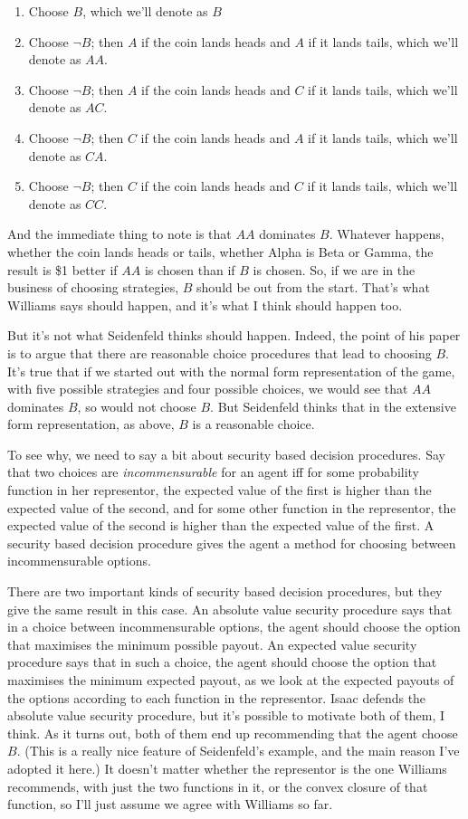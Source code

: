 \begin{enumerate}
\item Choose $B$, which we'll denote as $B$
\item Choose $\neg B$; then $A$ if the coin lands heads and $A$ if it lands tails, which we'll denote as $AA$.
\item Choose $\neg B$; then $A$ if the coin lands heads and $C$ if it lands tails, which we'll denote as $AC$.
\item Choose $\neg B$; then $C$ if the coin lands heads and $A$ if it lands tails, which we'll denote as $CA$.
\item Choose $\neg B$; then $C$ if the coin lands heads and $C$ if it lands tails, which we'll denote as $CC$.
\end{enumerate}
And the immediate thing to note is that $AA$ dominates $B$. Whatever happens, whether the coin lands heads or tails, whether Alpha is Beta or Gamma, the result is \$1 better if $AA$ is chosen than if $B$ is chosen. So, if we are in the business of choosing strategies, $B$ should be out from the start. That's what Williams says should happen, and it's what I think should happen too.

But it's not what Seidenfeld thinks should happen. Indeed, the point of his paper is to argue that there are reasonable choice procedures that lead to choosing $B$. It's true that if we started out with the normal form representation of the game, with five possible strategies and four possible choices, we would see that $AA$ dominates $B$, so would not choose $B$. But Seidenfeld thinks that in the extensive form representation, as above, $B$ is a reasonable choice.

To see why, we need to say a bit about security based decision procedures. Say that two choices are \textit{incommensurable} for an agent iff for some probability function in her representor, the expected value of the first is higher than the expected value of the second, and for some other function in the representor, the expected value of the second is higher than the expected value of the first. A security based decision procedure gives the agent a method for choosing between incommensurable options.

There are two important kinds of security based decision procedures, but they give the same result in this case. An absolute value security procedure says that in a choice between incommensurable options, the agent should choose the option that maximises the minimum possible payout. An expected value security procedure says that in such a choice, the agent should choose the option that maximises the minimum expected payout, as we look at the expected payouts of the options according to each function in the representor. Isaac \citet{Levi1986} defends the absolute value security procedure, but it's possible to motivate both of them, I think. As it turns out, both of them end up recommending that the agent choose $B$. (This is a really nice feature of Seidenfeld's example, and the main reason I've adopted it here.) It doesn't matter whether the representor is the one Williams recommends, with just the two functions in it, or the convex closure of that function, so I'll just assume we agree with Williams so far. 

